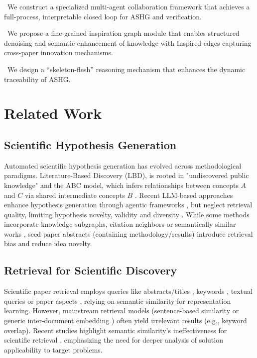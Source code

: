 \documentclass[runningheads]{llncs}
\begin{document}
\noindent\textbullet\ We construct a specialized multi-agent collaboration framework that achieves a full-process, interpretable closed loop for ASHG and verification.

\noindent\textbullet\ We propose a fine-grained inspiration graph module that enables structured denoising and semantic enhancement of knowledge with Inspired edges capturing cross-paper innovation mechanisms.

\noindent\textbullet\ We design a ``skeleton-flesh'' reasoning mechanism that enhances the dynamic traceability of ASHG.


\section{Related Work}

\subsection{Scientific Hypothesis Generation}
Automated scientific hypothesis generation has evolved across methodological paradigms. Literature-Based Discovery (LBD), is rooted in "undiscovered public knowledge" and the ABC model, which infers relationships between concepts $A$ and $C$ via shared intermediate concepts $B$ \cite{swanson1986fish,swanson1986undiscovered}. Recent LLM-based approaches enhance hypothesis generation through agentic frameworks \cite{wang2024research,si2024large,baek2025research}, but neglect retrieval quality, limiting hypothesis novelty, validity and diversity \cite{lewis2020retrieval,zhao2024survey,li2024b}. While some methods incorporate knowledge subgraphs, citation neighbors or semantically similar works \cite{wang2024research,li2024b,baek2025research}, seed paper abstracts (containing methodology/results) introduce retrieval bias and reduce idea novelty.

\subsection{Retrieval for Scientific Discovery}
Scientific paper retrieval employs queries like abstracts/titles \cite{singh2023scincl,ostendorff2022neighborhood,cohan2020specter}, keywords \cite{sesagiri2017full}, textual queries \cite{anand2017proposed,parisot2022scientific,medic2023similarity} or paper aspects \cite{singh2024scispace,singh2023scincl,mysore2022multi,ostendorff2022s2orc}, relying on semantic similarity for representation learning. However, mainstream retrieval models (sentence-based similarity \cite{reimers2019sentence,beltagy2019scibert} or generic inter-document embedding \cite{cohan2020specter,singh2022specter2}) often yield irrelevant results (e.g., keyword overlap). Recent studies highlight semantic similarity's ineffectiveness for scientific retrieval \cite{yang2024c}, emphasizing the need for deeper analysis of solution applicability to target problems.
\end{document}
